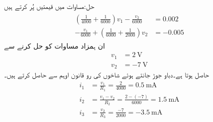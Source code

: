 حل:مساوات  میں قیمتیں پُر کرتے ہیں
\begin{gather}
\begin{aligned}
\left( \frac{1}{4000}+\frac{1}{6000}\right) v_1 - \frac{v_2}{6000}&=0.002\\
-\frac{v_1}{6000}+\left(\frac{1}{6000}+\frac{1}{2000}\right)v_2&=-0.005
\end{aligned}
\end{gather}
ان ہمزاد مساوات کو حل کرنے سے
\begin{align*}
v_1&=\SI{2}{\volt}\\
v_2&=\SI{-7}{\volt}
\end{align*}
حاصل ہوتا ہے۔دباو جوڑ جانتے ہوئے شاخوں کی رو قانون اوہم سے حاصل کرتے ہیں۔
\begin{align*}
i_1&=\frac{v_1}{R_1}=\frac{2}{4000}=\SI{0.5}{\milli\ampere}\\
i_2&=\frac{v_1-v_2}{R_2}=\frac{2-(-7)}{6000}=\SI{1.5}{\milli\ampere}\\
i_3&=\frac{v_2}{R_3}=\frac{-7}{2000}=\SI{-3.5}{\milli\ampere}
\end{align*}


